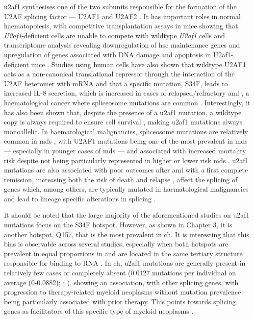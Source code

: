 \Ac{u2af1} synthesises one of the two subunits responsible for the formation of the U2AF splicing factor --- U2AF1 and U2AF2 \cite{Palangat2019-nv}. It has important roles in normal haematopoiesis, with competitive transplantation assays in mice showing that \textit{U2af1}-deficient cells are unable to compete with wildtype \textit{U2af1} cells and transcriptome analysis revealing downregulation of \ac{hsc} maintenance genes and upregulation of genes associated with DNA damage and apoptosis in U2af1-deficient mice \cite{Dutta2020-ah}. Studies using human cells have also shown that wildtype U2AF1 acts as a non-canonical translational repressor through the interaction of the U2AF heteromer with mRNA and that a specific mutation, S34F, leads to increased IL-8 secretion, which is increased in cases of relapsed/refractory \ac{aml} \cite{Palangat2019-nv}, a haematological cancer where spliceosome mutations are common \cite{Papaemmanuil2016-jy}. Interestingly, it has also been shown that, despite the presence of a \ac{u2af1} mutation, a wildtype copy is always required to ensure cell survival \cite{Fei2016-cc,Wadugu2020-df}, making \ac{u2af1} mutations always monoallelic. In haematological malignancies, spliceosome mutations are relatively common in \ac{mds} \cite{Yoshida2011-zp}, with U2AF1 mutations being one of the most prevalent in \ac{mds} --- especially in younger cases of \ac{mds} --- and associated with increased mortality risk despite not being particularly represented in higher or lower risk \ac{mds} \cite{Li2018-vz}. \ac{u2af1} mutations are also associated with poor outcomes after \ac{aml} with a first complete remission, increasing both the risk of death and relapse \cite{Saygin2018-bb}, affect the splicing of genes which, among others, are typically mutated in haematological malignancies \cite{Przychodzen2013-vb} and lead to lineage specific alterations in splicing \cite{Yip2017-kf}. 

It should be noted that the large majority of the aforementioned studies on \ac{u2af1} mutations focus on the S34F hotspot. However, as shown in Chapter 3, it is another hotspot, Q157, that is the most prevalent in \ac{ch}. It is interesting that this bias is observable across several studies, especially when both hotspots are prevalent in equal proportions in and are located in the same tertiary structure responsible for binding to RNA \cite{Adema2016-fa}. In \ac{ch}, \ac{u2af1} mutations are generally present in relatively few cases or completely absent \cite{Jaiswal2014-rl,Genovese2014-eu,Zink2017-zi,Bolton2020-ct,Coombs2017-ph,Acuna-Hidalgo2017-ng,Desai2018-pj,Young2016-du,Young2019-rz} (0.0127 mutations per individual on average (0-0.0882); ; ), showing an association, with other splicing genes, with progression to therapy-related myeloid neoplasms without mutation prevalence being particularly associated with prior therapy. This points towards splicing genes as facilitators of this specific type of myeloid neoplasms \cite{Bolton2020-ct}. 

